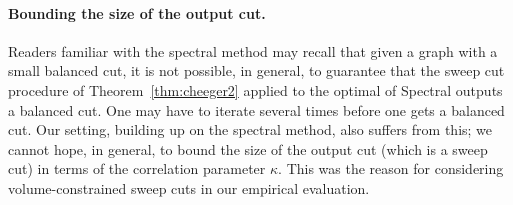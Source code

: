 \documentclass[11pt]{article}
\begin{document}
\paragraph{Bounding the size of the output cut.}
Readers familiar with the spectral method may recall that given a graph with a small balanced cut, it is not possible, in general, to guarantee that the sweep cut procedure of Theorem~\ref{thm:cheeger2}  applied to the optimal of \textsf{Spectral} outputs  a balanced cut. One may have to iterate several times before one gets a balanced cut.  Our setting, building up on the spectral method,  also suffers from this;  we cannot hope, in general,  to bound the size of the output cut  (which is a sweep cut) in terms of the correlation parameter $\kappa.$ 
This was the reason for considering volume-constrained sweep cuts in our
empirical evaluation.
\end{document}
